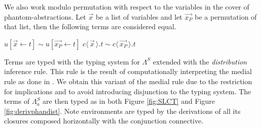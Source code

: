 \documentclass[a4paper,UKenglish,cleveref, autoref]{lipics-v2019}
\newcommand{\FALC}{\Lambda^{S}_{a}}
\newcommand{\SLC}{\Lambda^{S}}
\newcommand{\app}[2]{#1 \, #2}
\newcommand{\fake}[3]{#1 \langle \, #2 \, \rangle . #3}
\newcommand{\share}[3]{#1 [#2 \leftarrow #3]}
\newcommand{\dist}[5]{#1 [ #2 \, \vert \, \fakedist{#4}{#5} \, #3 ]}
\newcommand{\fakedist}[2]{#1 \langle \, #2 \, \rangle}
\begin{document}
%
%
%
%
%

We also work modulo permutation with respect to the variables in the cover of phantom-abstractions. Let $\vec{x}$ be a list of variables and let $\vec{x_{P}}$ be a permutation of that list, then the following terms are considered equal.

\begin{center}
	$\share{u}{\vec{x}}{t} \sim \share{u}{\vec{x_{P}}}{t}$
	\hspace{1cm}
	$\fake{c}{\vec{x}}{t} \sim \fake{c}{\vec{x_{P}}}{t}$
\end{center}

\noindent Terms are typed with the typing system for $\SLC$ extended with the \emph{distribution} inference rule. This rule is the result of computationally interpreting the medial rule as done in \cite{gundersen2013atomic}. We obtain this variant of the medial rule due to the restriction for implications and to avoid introducing disjunction to the typing system. The terms of $\FALC$ are then typed as in both Figure \ref{fig:SLCT} and Figure \ref{fig:derivphandist}. Note environments are typed by the derivations of all its closures composed horizontally with the conjunction connective.
\end{document}
